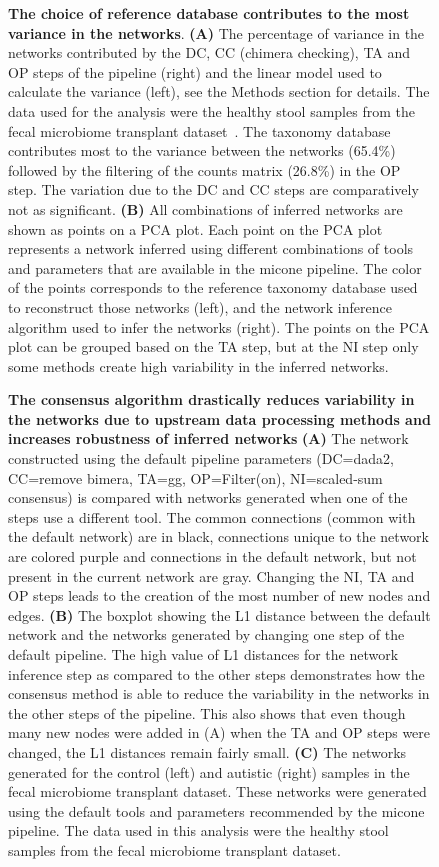   \begin{figure}[H]
    \centering
      \caption{
      \textbf{The choice of reference database contributes to the most variance in the networks}.
      \textbf{(A)} The percentage of variance in the networks contributed by the DC, CC (chimera checking), TA and OP steps of the pipeline (right) and the linear model used to calculate the variance (left), see the Methods section for details.
      The data used for the analysis were the healthy stool samples from the fecal microbiome transplant dataset~\cite{Kang2017}.
      The taxonomy database contributes most to the variance between the networks (65.4\%) followed by the filtering of the counts matrix (26.8\%) in the OP step.
      The variation due to the DC and CC steps are comparatively not as significant.
      \textbf{(B)} All combinations of inferred networks are shown as points on a PCA plot.
      Each point on the PCA plot represents a network inferred using different combinations of tools and parameters that are available in the \ac{micone} pipeline.
      The color of the points corresponds to the reference taxonomy database used to reconstruct those networks (left), and the network inference algorithm used to infer the networks (right).
      The points on the PCA plot can be grouped based on the TA step, but at the NI step only some methods create high variability in the inferred networks.
    }
    \label{fig:figure6}
  \end{figure}

  \begin{figure}[H]
    \centering
    \caption{
      \textbf{The consensus algorithm drastically reduces variability in the networks due to upstream data processing methods and increases robustness of inferred networks}
      \textbf{(A)} The network constructed using the default pipeline parameters (DC=\ac{dada2}, CC=remove bimera, TA=\ac{gg}, OP=Filter(on), NI=scaled-sum consensus) is compared with networks generated when one of the steps use a different tool.
      The common connections (common with the default network) are in black, connections unique to the network are colored purple and connections in the default network, but not present in the current network are gray.
      Changing the NI, TA and OP steps leads to the creation of the most number of new nodes and edges.
      \textbf{(B)} The boxplot showing the L1 distance between the default network and the networks generated by changing one step of the default pipeline.
      The high value of L1 distances for the network inference step as compared to the other steps demonstrates how the consensus method is able to reduce the variability in the networks in the other steps of the pipeline.
      This also shows that even though many new nodes were added in (A) when the TA and OP steps were changed, the L1 distances remain fairly small.
      \textbf{(C)} The networks generated for the control (left) and autistic (right) samples in the fecal microbiome transplant dataset.
      These networks were generated using the default tools and parameters recommended by the \ac{micone} pipeline.
      The data used in this analysis were the healthy stool samples from the fecal microbiome transplant dataset.
    }
    \label{fig:figure7}
  \end{figure}

